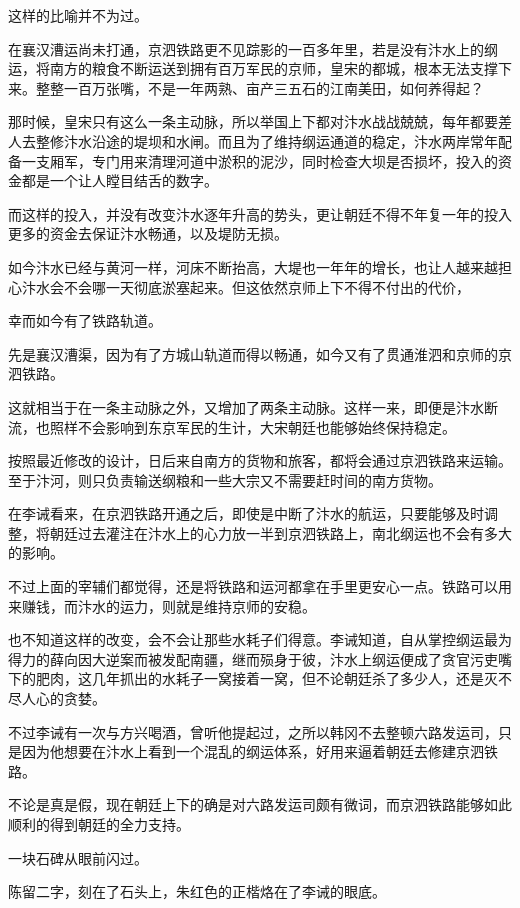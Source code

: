 这样的比喻并不为过。

在襄汉漕运尚未打通，京泗铁路更不见踪影的一百多年里，若是没有汴水上的纲运，将南方的粮食不断运送到拥有百万军民的京师，皇宋的都城，根本无法支撑下来。整整一百万张嘴，不是一年两熟、亩产三五石的江南美田，如何养得起？

那时候，皇宋只有这么一条主动脉，所以举国上下都对汴水战战兢兢，每年都要差人去整修汴水沿途的堤坝和水闸。而且为了维持纲运通道的稳定，汴水两岸常年配备一支厢军，专门用来清理河道中淤积的泥沙，同时检查大坝是否损坏，投入的资金都是一个让人瞠目结舌的数字。

而这样的投入，并没有改变汴水逐年升高的势头，更让朝廷不得不年复一年的投入更多的资金去保证汴水畅通，以及堤防无损。

如今汴水已经与黄河一样，河床不断抬高，大堤也一年年的增长，也让人越来越担心汴水会不会哪一天彻底淤塞起来。但这依然京师上下不得不付出的代价，

幸而如今有了铁路轨道。

先是襄汉漕渠，因为有了方城山轨道而得以畅通，如今又有了贯通淮泗和京师的京泗铁路。

这就相当于在一条主动脉之外，又增加了两条主动脉。这样一来，即便是汴水断流，也照样不会影响到东京军民的生计，大宋朝廷也能够始终保持稳定。

按照最近修改的设计，日后来自南方的货物和旅客，都将会通过京泗铁路来运输。至于汴河，则只负责输送纲粮和一些大宗又不需要赶时间的南方货物。

在李诫看来，在京泗铁路开通之后，即使是中断了汴水的航运，只要能够及时调整，将朝廷过去灌注在汴水上的心力放一半到京泗铁路上，南北纲运也不会有多大的影响。



不过上面的宰辅们都觉得，还是将铁路和运河都拿在手里更安心一点。铁路可以用来赚钱，而汴水的运力，则就是维持京师的安稳。

也不知道这样的改变，会不会让那些水耗子们得意。李诫知道，自从掌控纲运最为得力的薛向因大逆案而被发配南疆，继而殒身于彼，汴水上纲运便成了贪官污吏嘴下的肥肉，这几年抓出的水耗子一窝接着一窝，但不论朝廷杀了多少人，还是灭不尽人心的贪婪。

不过李诫有一次与方兴喝酒，曾听他提起过，之所以韩冈不去整顿六路发运司，只是因为他想要在汴水上看到一个混乱的纲运体系，好用来逼着朝廷去修建京泗铁路。

不论是真是假，现在朝廷上下的确是对六路发运司颇有微词，而京泗铁路能够如此顺利的得到朝廷的全力支持。

一块石碑从眼前闪过。

陈留二字，刻在了石头上，朱红色的正楷烙在了李诫的眼底。


